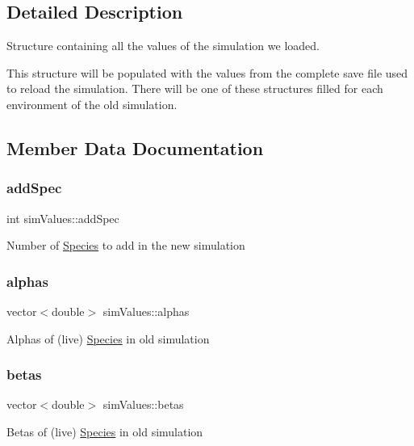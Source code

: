 \subsection{Detailed Description}
Structure containing all the values of the simulation we loaded. 

This structure will be populated with the values from the complete save file used to reload the simulation. There will be one of these structures filled for each environment of the old simulation. 

\subsection{Member Data Documentation}
\hypertarget{structsimValues_ac7fbf812eba3e2b88996d1366131bf8e}{}\label{structsimValues_ac7fbf812eba3e2b88996d1366131bf8e} 
\subsubsection{\texorpdfstring{add\+Spec}{addSpec}}
{\footnotesize\ttfamily int sim\+Values\+::add\+Spec}

Number of \hyperlink{classSpecies}{Species} to add in the new simulation \hypertarget{structsimValues_aa7977c641471b71ca3f88d98e2b01831}{}\label{structsimValues_aa7977c641471b71ca3f88d98e2b01831} 
\subsubsection{\texorpdfstring{alphas}{alphas}}
{\footnotesize\ttfamily vector$<$double$>$ sim\+Values\+::alphas}

Alphas of (live) \hyperlink{classSpecies}{Species} in old simulation \hypertarget{structsimValues_ab7b209f99b228a55680d64fc964b0d34}{}\label{structsimValues_ab7b209f99b228a55680d64fc964b0d34} 
\subsubsection{\texorpdfstring{betas}{betas}}
{\footnotesize\ttfamily vector$<$double$>$ sim\+Values\+::betas}

Betas of (live) \hyperlink{classSpecies}{Species} in old simulation \hypertarget{structsimValues_a08f1c4e0b6042043876d9d2d2699a922}{}\label{structsimValues_a08f1c4e0b6042043876d9d2d2699a922} 
